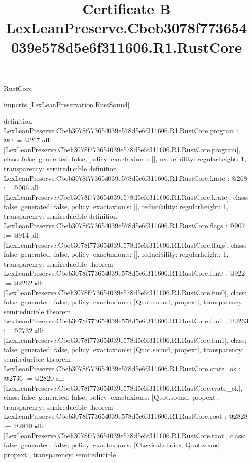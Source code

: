 \begin{lexlean}{RustCore}
\title{Certificate B LexLeanPreserve.Cbeb3078f773654039e578d5e6f311606.R1.RustCore}
\begin{coremodule}
imports [LexLeanPreservation.RustSound]

definition LexLeanPreserve.Cbeb3078f773654039e578d5e6f311606.R1.RustCore.program : @0 := @267 {
  all: [LexLeanPreserve.Cbeb3078f773654039e578d5e6f311606.R1.RustCore.program],
  class: false,
  generated: false,
  policy: exact{axioms: []},
  reducibility: regular{height: 1},
  transparency: semireducible
}
definition LexLeanPreserve.Cbeb3078f773654039e578d5e6f311606.R1.RustCore.krate : @268 := @906 {
  all: [LexLeanPreserve.Cbeb3078f773654039e578d5e6f311606.R1.RustCore.krate],
  class: false,
  generated: false,
  policy: exact{axioms: []},
  reducibility: regular{height: 1},
  transparency: semireducible
}
definition LexLeanPreserve.Cbeb3078f773654039e578d5e6f311606.R1.RustCore.flags : @907 := @914 {
  all: [LexLeanPreserve.Cbeb3078f773654039e578d5e6f311606.R1.RustCore.flags],
  class: false,
  generated: false,
  policy: exact{axioms: []},
  reducibility: regular{height: 1},
  transparency: semireducible
}
theorem LexLeanPreserve.Cbeb3078f773654039e578d5e6f311606.R1.RustCore.fun0 : @922 := @2262 {
  all: [LexLeanPreserve.Cbeb3078f773654039e578d5e6f311606.R1.RustCore.fun0],
  class: false,
  generated: false,
  policy: exact{axioms: [Quot.sound, propext]},
  transparency: semireducible
}
theorem LexLeanPreserve.Cbeb3078f773654039e578d5e6f311606.R1.RustCore.fun1 : @2263 := @2732 {
  all: [LexLeanPreserve.Cbeb3078f773654039e578d5e6f311606.R1.RustCore.fun1],
  class: false,
  generated: false,
  policy: exact{axioms: [Quot.sound, propext]},
  transparency: semireducible
}
theorem LexLeanPreserve.Cbeb3078f773654039e578d5e6f311606.R1.RustCore.crate_ok : @2736 := @2820 {
  all: [LexLeanPreserve.Cbeb3078f773654039e578d5e6f311606.R1.RustCore.crate_ok],
  class: false,
  generated: false,
  policy: exact{axioms: [Quot.sound, propext]},
  transparency: semireducible
}
theorem LexLeanPreserve.Cbeb3078f773654039e578d5e6f311606.R1.RustCore.root : @2828 := @2838 {
  all: [LexLeanPreserve.Cbeb3078f773654039e578d5e6f311606.R1.RustCore.root],
  class: false,
  generated: false,
  policy: exact{axioms: [Classical.choice, Quot.sound, propext]},
  transparency: semireducible
}


\end{coremodule}
\end{lexlean}
